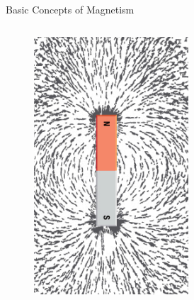 \documentclass{beamer}
\begin{document}
\begin{frame}{Basic Concepts of Magnetism}
\begin{columns}
\begin{figure}
    \centering
    \includegraphics[width=1\linewidth]{mgng.png}
\end{figure}
\end{columns}
\end{frame}
\end{document}
